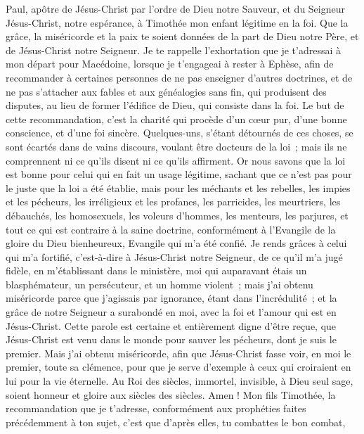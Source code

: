 \BFont
\begin{multicols}{2}
\VerseOne{}Paul, apôtre de Jésus-Christ par l’ordre de Dieu notre Sauveur, et du Seigneur Jésus-Christ, notre espérance,
à Timothée mon enfant légitime en la foi. Que la grâce, la miséricorde et la paix te soient données de la part de Dieu notre Père, et de Jésus-Christ notre Seigneur.
Je te rappelle l’exhortation que je t’adressai à mon départ pour Macédoine, lorsque je t’engageai à rester à Ephèse, afin de recommander à certaines personnes de ne pas enseigner d’autres doctrines,
et de ne pas s’attacher aux fables et aux généalogies sans fin, qui produisent des disputes, au lieu de former l’édifice de Dieu, qui consiste dans la foi.
Le but de cette recommandation, c’est la charité qui procède d'un cœur pur, d'une bonne conscience, et d'une foi sincère.
Quelques-uns, s'étant détournés de ces choses, se sont écartés dans de vains discours,
voulant être docteurs de la loi ; mais ils ne comprennent ni ce qu’ils disent ni ce qu’ils affirment.
Or nous savons que la loi est bonne pour celui qui en fait un usage légitime,
sachant que ce n’est pas pour le juste que la loi a été établie, mais pour les méchants et les rebelles, les impies et les pécheurs, les irréligieux et les profanes, les parricides, les meurtriers,
les débauchés, les homosexuels, les voleurs d’hommes, les menteurs, les parjures, et tout ce qui est contraire à la saine doctrine,
conformément à l'Evangile de la gloire du Dieu bienheureux, Evangile qui m'a été confié.
Je rends grâces à celui qui m'a fortifié, c'est-à-dire à Jésus-Christ notre Seigneur, de ce qu'il m'a jugé fidèle, en m’établissant dans le ministère,
moi qui auparavant étais un blasphémateur, un persécuteur, et un homme violent ; mais j'ai obtenu miséricorde parce que j’agissais par ignorance, étant dans l’incrédulité ;
et la grâce de notre Seigneur a surabondé en moi, avec la foi et l'amour qui est en Jésus-Christ.
Cette parole est certaine et entièrement digne d'être reçue, que Jésus-Christ est venu dans le monde pour sauver les pécheurs, dont je suis le premier.
Mais j'ai obtenu miséricorde, afin que Jésus-Christ fasse voir, en moi le premier, toute sa clémence, pour que je serve d'exemple à ceux qui croiraient en lui pour la vie éternelle.
Au Roi des siècles, immortel, invisible, à Dieu seul sage, soient honneur et gloire aux siècles des siècles. Amen !
Mon fils Timothée, la recommandation que je t’adresse, conformément aux prophéties faites précédemment à ton sujet, c’est que d’après elles, tu combattes le bon combat,

\end{multicols}
